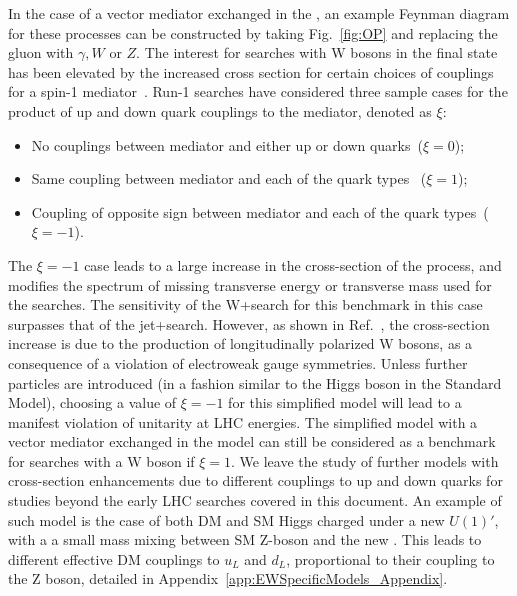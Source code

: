 In the case of a vector mediator exchanged in the \schannel, 
an example Feynman diagram for these processes can be constructed by taking
Fig.~\ref{fig:OP} and replacing the gluon with $\gamma,W$ or $Z$.
The interest for searches with W bosons in the final state
has been elevated by the increased cross section
for certain choices of couplings for a spin-1 mediator~\cite{Bai:2012xg}.
Run-1 searches have considered three sample cases for the product of
up and down quark couplings to the mediator, denoted as $\xi$:
\begin{itemize}
 \item No couplings between mediator and either up or down quarks~($\xi=0$);
 \item Same coupling between mediator and each of the quark types~ ($\xi=1$);
 \item Coupling of opposite sign between mediator and each of the quark types~($\xi=-1$).
\end{itemize}
The $\xi=-1$ case leads to a large increase in the cross-section of the process,
and modifies the spectrum of missing transverse energy or
transverse mass used for the searches. The sensitivity of the W+\MET search for
this benchmark in this case surpasses that of the jet+\MET search.
However, as shown in Ref.~\cite{Bell:2015sza}, the cross-section increase is due
to the production of longitudinally polarized W bosons,
as a consequence of a violation of electroweak gauge symmetries. Unless further
particles are introduced (in a fashion similar
to the Higgs boson in the Standard Model), choosing a value of $\xi=-1$
for this simplified model will lead to a manifest violation of unitarity at LHC energies.
The simplified model with a vector mediator exchanged in the \schannel model
can still be considered as a benchmark for searches with a W boson if $\xi=1$.
We leave the study of further models with cross-section enhancements due
to different couplings to up and down quarks for studies beyond the early LHC searches
covered in this document.
An example of such model is the case of both DM and SM Higgs charged under a new $U(1)'$,
with a a small mass mixing between SM Z-boson and the new \Zprime. This leads
to different effective DM couplings to $u_L$ and $d_L$, proportional to
their coupling to the Z boson, detailed in Appendix~\ref{app:EWSpecificModels_Appendix}.




